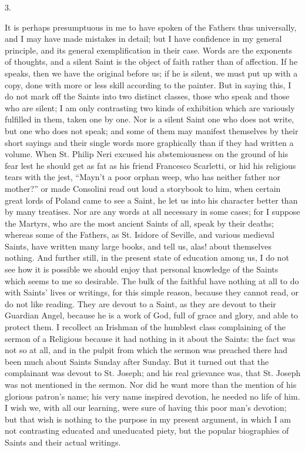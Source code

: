 3.

It is perhaps presumptuous in me to have spoken of the Fathers thus
universally, and I may have made mistakes in detail; but I have
confidence in my general principle, and its general exemplification in
their case. Words are the exponents of thoughts, and a silent Saint is
the object of faith rather than of affection. If he speaks, then we
have the original before us; if he is silent, we must put up with a
copy, done with more or less skill according to the painter. But in
saying this, I do not mark off the Saints into two distinct classes,
those who speak and those who are silent; I am only contrasting
two kinds of exhibition which are variously fulfilled in them, taken
one by one. Nor is a silent Saint one who does not write, but one who
does not speak; and some of them may manifest themselves by their
short sayings and their single words more graphically than if they had
written a volume. When St. Philip Neri excused his abstemiousness on
the ground of his fear lest he should get as fat as his friend
Francesco Scarletti, or hid his religious tears with the jest,
``Mayn't a poor orphan weep, who has neither father nor
mother?'' or made Consolini read out loud a storybook to him, when
certain great lords of Poland came to see a Saint, he let us into his
character better than by many treatises. Nor are any words at all
necessary in some cases; for I suppose the Martyrs, who are the most
ancient Saints of all, speak by their deaths; whereas some of the
Fathers, as St. Isidore of Seville, and various medieval Saints, have
written many large books, and tell us, alas! about themselves nothing.
And further still, in the present state of education among us, I do
not see how it is possible we should enjoy that personal knowledge of
the Saints which seems to me so desirable. The bulk of the faithful
have nothing at all to do with Saints' lives or writings, for this
simple reason, because they cannot read, or do not like reading. They
are devout to a Saint, as they are devout to their Guardian Angel,
because he is a work of God, full of grace and glory, and able to
protect them. I recollect an Irishman of the humblest class
complaining of the sermon of a Religious because it had nothing in it
about the Saints: the fact was not so at all, and in the pulpit from
which the sermon was preached there had been much about Saints Sunday
after Sunday. But it turned out that the complainant was devout to St.
Joseph; and his real grievance was, that St. Joseph was not
mentioned in the sermon. Nor did he want more than the mention of his
glorious patron's name; his very name inspired devotion, he needed no
life of him. I wish we, with all our learning, were sure of having
this poor man's devotion; but that wish is nothing to the purpose in
my present argument, in which I am not contrasting educated and
uneducated piety, but the popular biographies of Saints and their
actual writings.

